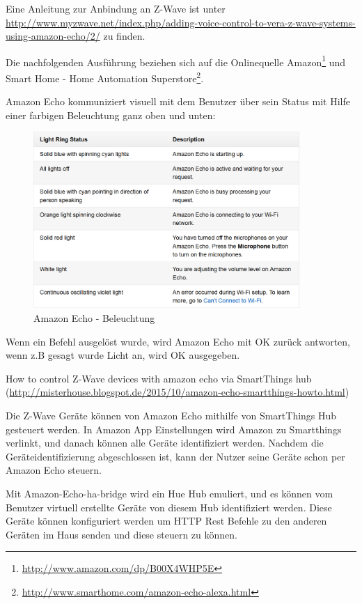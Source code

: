 Eine Anleitung zur Anbindung an Z-Wave ist unter \url{http://www.myzwave.net/index.php/adding-voice-control-to-vera-z-wave-systems-using-amazon-echo/2/} zu finden.

Die nachfolgenden Ausführung beziehen sich auf die Onlinequelle \glqq Amazon\grqq\footnote{\url{http://www.amazon.com/dp/B00X4WHP5E}} und \glqq Smart Home - Home Automation Superstore\grqq \footnote{\url{http://www.smarthome.com/amazon-echo-alexa.html}}.

 \newpage
Amazon Echo kommuniziert visuell mit dem Benutzer über sein Status mit Hilfe einer farbigen Beleuchtung ganz oben und unten:

\begin{figure}[h!]
	\centering
	\includegraphics[width=0.9\textwidth]{img/Feedback-Mechanismen/AmazonEchoLight.png}
	\caption{Amazon Echo - Beleuchtung}
	\label{fig:feedbackAmazonEchoLights}
\end{figure}

Wenn ein Befehl ausgelöst wurde, wird Amazon Echo mit \glqq OK\grqq{} zurück antworten, wenn z.B gesagt wurde \glqq Licht an\grqq , wird \glqq OK\grqq{} ausgegeben.

How to control Z-Wave devices with amazon echo via SmartThings hub (\url{http://misterhouse.blogspot.de/2015/10/amazon-echo-smartthings-howto.html})

Die Z-Wave Geräte können von Amazon Echo mithilfe von SmartThings Hub gesteuert werden. In
Amazon App Einstellungen wird Amazon zu Smartthings verlinkt, und danach können alle Geräte
identifiziert werden. Nachdem die Geräteidentifizierung abgeschlossen ist, kann der Nutzer seine Geräte schon per Amazon Echo steuern.

Mit Amazon-Echo-ha-bridge wird ein Hue Hub emuliert, und es können vom Benutzer virtuell erstellte Geräte von diesem Hub identifiziert werden. Diese Geräte können konfiguriert werden um HTTP Rest Befehle zu den anderen Geräten im Haus senden und diese steuern zu können.

